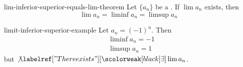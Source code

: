 \documentclass[preview]{standalone}
\begin{document}
\begin{snippettheorem}{lim-inferior-superior-equals-lim-theorem}{}
    Let \(\{a_n\}\) be a \sequence. If \(\lim a_n\) exists, then
    \[
        \lim a_n = \liminf a_n = \limsup a_n
    \]
\end{snippettheorem}

\begin{snippetexample}{limit-inferior-superior-example}{}
    Let \(a_n = (-1)^n\). Then
    \begin{align*}
        &\liminf a_n = -1 \\
        &\limsup a_n = 1
    \end{align*}
    but \(\not\exists \lim a_n\).
\end{snippetexample}
\end{document}

